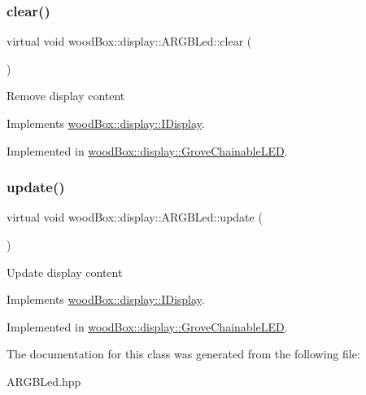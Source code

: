 \subsubsection{\texorpdfstring{clear()}{clear()}}
{\footnotesize\ttfamily virtual void wood\+Box\+::display\+::\+A\+R\+G\+B\+Led\+::clear (\begin{DoxyParamCaption}{ }\end{DoxyParamCaption})\hspace{0.3cm}{\ttfamily [pure virtual]}}

Remove display content 

Implements \mbox{\hyperlink{classwood_box_1_1display_1_1_i_display_a7030f0768c1ef15ce936a259406168dc}{wood\+Box\+::display\+::\+I\+Display}}.



Implemented in \mbox{\hyperlink{classwood_box_1_1display_1_1_grove_chainable_l_e_d_a1c42c42ee9643aa914ab20a191e4adfd}{wood\+Box\+::display\+::\+Grove\+Chainable\+L\+ED}}.

\mbox{\label{classwood_box_1_1display_1_1_a_r_g_b_led_ab71f321d91e931f95b96d1f492a9454d}} 
\subsubsection{\texorpdfstring{update()}{update()}}
{\footnotesize\ttfamily virtual void wood\+Box\+::display\+::\+A\+R\+G\+B\+Led\+::update (\begin{DoxyParamCaption}{ }\end{DoxyParamCaption})\hspace{0.3cm}{\ttfamily [pure virtual]}}

Update display content 

Implements \mbox{\hyperlink{classwood_box_1_1display_1_1_i_display_ad8c0811b8b807ce119a06c7806004de7}{wood\+Box\+::display\+::\+I\+Display}}.



Implemented in \mbox{\hyperlink{classwood_box_1_1display_1_1_grove_chainable_l_e_d_a650969665d0b5607465a63159c62e4ef}{wood\+Box\+::display\+::\+Grove\+Chainable\+L\+ED}}.



The documentation for this class was generated from the following file\+:\begin{DoxyCompactItemize}
\item 
A\+R\+G\+B\+Led.\+hpp\end{DoxyCompactItemize}
